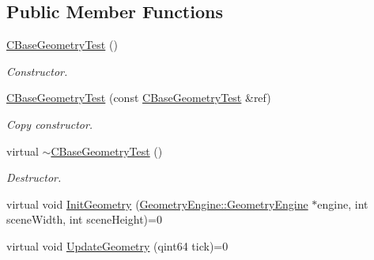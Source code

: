 \subsection*{Public Member Functions}
\begin{DoxyCompactItemize}
\item 
\mbox{\label{class_unit_test_1_1_c_base_geometry_test_aa7b577ed63697e34e70960658bab11e7}} 
\mbox{\hyperlink{class_unit_test_1_1_c_base_geometry_test_aa7b577ed63697e34e70960658bab11e7}{C\+Base\+Geometry\+Test}} ()
\begin{DoxyCompactList}\small\item\em Constructor. \end{DoxyCompactList}\item 
\mbox{\label{class_unit_test_1_1_c_base_geometry_test_afbac87d191bc9212b6872124efd7622c}} 
\mbox{\hyperlink{class_unit_test_1_1_c_base_geometry_test_afbac87d191bc9212b6872124efd7622c}{C\+Base\+Geometry\+Test}} (const \mbox{\hyperlink{class_unit_test_1_1_c_base_geometry_test}{C\+Base\+Geometry\+Test}} \&ref)
\begin{DoxyCompactList}\small\item\em Copy constructor. \end{DoxyCompactList}\item 
\mbox{\label{class_unit_test_1_1_c_base_geometry_test_afb405c4d6976d32a580909ebaa602739}} 
virtual \mbox{\hyperlink{class_unit_test_1_1_c_base_geometry_test_afb405c4d6976d32a580909ebaa602739}{$\sim$\+C\+Base\+Geometry\+Test}} ()
\begin{DoxyCompactList}\small\item\em Destructor. \end{DoxyCompactList}\item 
virtual void \mbox{\hyperlink{class_unit_test_1_1_c_base_geometry_test_a16e5804e7f134ae519722c47e756e3b0}{Init\+Geometry}} (\mbox{\hyperlink{class_geometry_engine_1_1_geometry_engine}{Geometry\+Engine\+::\+Geometry\+Engine}} $\ast$engine, int scene\+Width, int scene\+Height)=0
\item 
virtual void \mbox{\hyperlink{class_unit_test_1_1_c_base_geometry_test_afe9560d667ef457f7a203453c10593fd}{Update\+Geometry}} (qint64 tick)=0
\item 
\mbox{\label{class_unit_test_1_1_c_base_geometry_test_a8842760fc0c3523c870c27cf4da991d3}} 

\end{DoxyCompactItemize}
